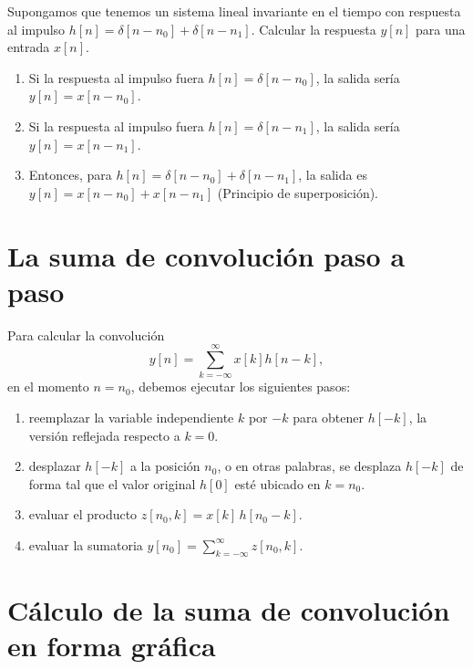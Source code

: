 \documentclass[11pt,a4paper,openany]{book}
\begin{document}
Supongamos que tenemos un sistema lineal invariante en el tiempo con respuesta al impulso $h[n] = \delta[n - n_{0}] + \delta[n - n_{1}]$. Calcular la respuesta $y[n]$ para una entrada $x[n]$.

\begin{enumerate}
	\item Si la respuesta al impulso fuera $h[n] = \delta[n - n_{0}]$, la salida sería $y[n] = x[n - n_{0}]$.
	\item Si la respuesta al impulso fuera $h[n] = \delta[n - n_{1}]$, la salida sería $y[n] = x[n - n_{1}]$.
	\item Entonces, para $h[n] = \delta[n - n_{0}] + \delta[n - n_{1}]$, la salida es $y[n] = x[n - n_{0}] + x[n - n_{1}]$ (Principio de superposición).
\end{enumerate}

\section{La suma de convolución paso a paso}

Para calcular la convolución 
\begin{equation}
	y[n] = \sum_{k=-\infty}^{\infty} x[k] h[n - k],
\end{equation}
en el momento $n = n_{0}$, debemos ejecutar los siguientes pasos:
\begin{enumerate}
	\item reemplazar la variable independiente $k$ por $-k$ para obtener $h[-k]$, la versión reflejada respecto a $k = 0$.
	\item desplazar $h[-k]$ a la posición $n_{0}$, o en otras palabras, se desplaza $h[-k]$ de forma tal que el valor original $h[0]$ esté ubicado en $k = n_{0}$.
	\item evaluar el producto $z[n_{0},k] = x[k] \, h[n_{0} - k]$.
	\item evaluar la sumatoria $y[n_{0}] = \sum_{k=-\infty}^{\infty} z[n_{0},k]$.
\end{enumerate}

\section{Cálculo de la suma de convolución en forma gráfica}
\end{document}
